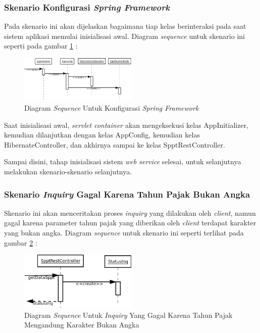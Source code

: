 \documentclass[pdftex,12pt, oneside]{article}
\begin{document}
\subsubsection{Skenario Konfigurasi \textit{Spring Framework}}

Pada skenario ini akan dijelaskan bagaimana tiap kelas berinteraksi pada saat sistem aplikasi memulai inisialisasi awal. Diagram \textit{sequence} untuk skenario ini seperti pada gambar \ref{fig:uml-seq-konf} :

\begin{figure}[H]
  \centering
  \includegraphics[width=0.5\textwidth]{./resources/diagram/uml-seq-konf}
  \caption{Diagram \textit{Sequence} Untuk Konfigurasi \textit{Spring Framework}}
  \label{fig:uml-seq-konf}
\end{figure}

Saat inisialisasi awal, \textit{servlet container} akan mengeksekusi kelas AppInitializer, kemudian dilanjutkan dengan kelas AppConfig, kemudian kelas HibernateController, dan akhirnya sampai ke kelas SpptRestController.

Sampai disini, tahap inisialisasi sistem \textit{web service} selesai, untuk selanjutnya melakukan skenario-skenario selanjutnya.

\subsubsection{Skenario \textit{Inquiry} Gagal Karena Tahun Pajak Bukan Angka}

Skenario ini akan menceritakan proses \textit{inquiry} yang dilakukan oleh \textit{client}, namun gagal karena parameter tahun pajak yang diberikan oleh \textit{client} terdapat karakter yang bukan angka. Diagram \textit{sequence} untuk skenario ini seperti terlihat pada gambar \ref{fig:uml-seq-inq-thn-not-valid} :

\begin{figure}[H]
  \centering
  \includegraphics[width=0.5\textwidth]{./resources/diagram/uml-seq-inq-thn-not-valid}
  \caption{Diagram \textit{Sequence} Untuk \textit{Inquiry} Yang Gagal Karena Tahun Pajak Mengandung Karakter Bukan Angka}
  \label{fig:uml-seq-inq-thn-not-valid}
\end{figure}
\end{document}
